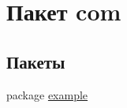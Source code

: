 \hypertarget{namespacecom}{}\section{Пакет com}
\label{namespacecom}
\subsection*{Пакеты}
\begin{DoxyCompactItemize}
\item 
package \mbox{\hyperlink{namespacecom_1_1example}{example}}
\end{DoxyCompactItemize}
